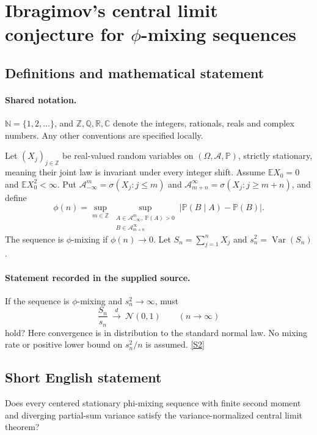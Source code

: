 \documentclass[11pt]{article}
\newcommand{\sref}[2]{\hyperlink{source:#1:#2}{[S#2]}}
\begin{document}
\section{Ibragimov's central limit conjecture for \texorpdfstring{$\phi$}{phi}-mixing sequences}\label{statement}

\subsection{Definitions and mathematical statement}

\paragraph{Shared notation.}$\mathbb N=\{1,2,\ldots\}$, and $\mathbb Z,\mathbb Q,\mathbb R,\mathbb C$ denote the integers, rationals, reals and complex numbers. Any other conventions are specified locally.


Let $(X_j)_{j\in\mathbb Z}$ be real-valued random variables on $(\Omega,\mathcal A,\mathbb P)$, strictly stationary, meaning their joint law is invariant under every integer shift. Assume $\mathbb E X_0=0$ and $\mathbb E X_0^2<\infty$. Put $\mathcal A_{-\infty}^{m}=\sigma(X_j:j\le m)$ and $\mathcal A_{m+n}^{\infty}=\sigma(X_j:j\ge m+n)$, and define
\[\phi(n)=\sup_{m\in\mathbb Z}\sup_{\substack{A\in\mathcal A_{-\infty}^{m},\ \mathbb P(A)>0\\B\in\mathcal A_{m+n}^{\infty}}}|\mathbb P(B\mid A)-\mathbb P(B)|.\]
The sequence is $\phi$-mixing if $\phi(n)\to0$. Let $S_n=\sum_{j=1}^n X_j$ and $s_n^2=\operatorname{Var}(S_n)$.
\paragraph{Statement recorded in the supplied source.}
If the sequence is $\phi$-mixing and $s_n^2\to\infty$, must
\[\frac{S_n}{s_n}\ \xrightarrow{\ d\ }\ \mathcal N(0,1)\qquad(n\to\infty)\]
hold? Here convergence is in distribution to the standard normal law. No mixing rate or positive lower bound on $s_n^2/n$ is assumed. \sref{statement}{2}
\subsection{Short English statement}
Does every centered stationary phi-mixing sequence with finite second moment and diverging partial-sum variance satisfy the variance-normalized central limit theorem?
\end{document}
